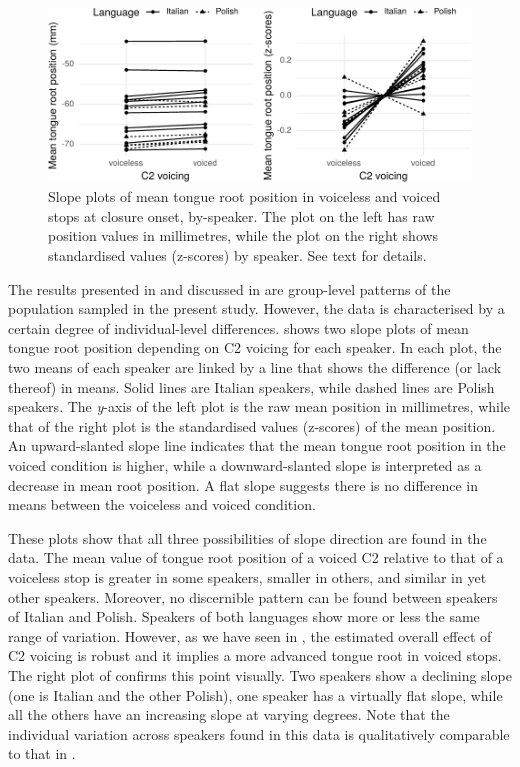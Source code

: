 \documentclass[preprint]{JASAnew}
\begin{document}
\label{s:idio}

\begin{figure}

{\centering \includegraphics[width=\linewidth]{./Figure8-1} 

}

\caption{Slope plots of mean tongue root position in voiceless and voiced stops at closure onset, by-speaker. The plot on the left has raw position values in millimetres, while the plot on the right shows standardised values (z-scores) by speaker. See text for details.}\label{f:Figure8}
\end{figure}

The results presented in  and discussed in
 are group-level patterns of the population sampled
in the present study. However, the data is characterised by a certain
degree of individual-level differences.  shows two slope
plots of mean tongue root position depending on C2 voicing for each
speaker. In each plot, the two means of each speaker are linked by a
line that shows the difference (or lack thereof) in means. Solid lines
are Italian speakers, while dashed lines are Polish speakers. The
\emph{y}-axis of the left plot is the raw mean position in millimetres,
while that of the right plot is the standardised values (z-scores) of
the mean position. An upward-slanted slope line indicates that the mean
tongue root position in the voiced condition is higher, while a
downward-slanted slope is interpreted as a decrease in mean root
position. A flat slope suggests there is no difference in means between
the voiceless and voiced condition.

These plots show that all three possibilities of slope direction are
found in the data. The mean value of tongue root position of a voiced C2
relative to that of a voiceless stop is greater in some speakers,
smaller in others, and similar in yet other speakers. Moreover, no
discernible pattern can be found between speakers of Italian and Polish.
Speakers of both languages show more or less the same range of
variation. However, as we have seen in , the estimated
overall effect of C2 voicing is robust and it implies a more advanced
tongue root in voiced stops. The right plot of  confirms
this point visually. Two speakers show a declining slope (one is Italian
and the other Polish), one speaker has a virtually flat slope, while all
the others have an increasing slope at varying degrees. Note that the
individual variation across speakers found in this data is qualitatively
comparable to that in \citet{ahn2018}.
\end{document}
